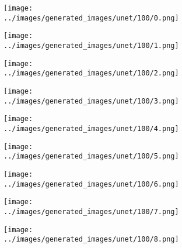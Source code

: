 \begin{figure}[H]
  \centering
 \captionsetup[subfigure]{labelformat=empty}
  \begin{subfigure}[b]{0.1\textwidth}
      \centering
      \texttt{[image: ../images/generated\_images/unet/100/0.png]}
  \end{subfigure}
  \hspace{1em}%
  \begin{subfigure}[b]{0.1\textwidth}
      \centering
      \texttt{[image: ../images/generated\_images/unet/100/1.png]}
  \end{subfigure}
  \hspace{1em}%
  \begin{subfigure}[b]{0.1\textwidth}
      \centering
      \texttt{[image: ../images/generated\_images/unet/100/2.png]}
  \end{subfigure}
  \hspace{1em}%
  \begin{subfigure}[b]{0.1\textwidth}
   \centering
   \texttt{[image: ../images/generated\_images/unet/100/3.png]}
 \end{subfigure}
 \hspace{1em}%
 \begin{subfigure}[b]{0.1\textwidth}
   \centering
   \texttt{[image: ../images/generated\_images/unet/100/4.png]}
 \end{subfigure}
 \hspace{1em}%
 \begin{subfigure}[b]{0.1\textwidth}
   \centering
   \texttt{[image: ../images/generated\_images/unet/100/5.png]}
 \end{subfigure}
 \hspace{1em}%
 \begin{subfigure}[b]{0.1\textwidth}
   \centering
   \texttt{[image: ../images/generated\_images/unet/100/6.png]}
 \end{subfigure}
 \hspace{1em}%
 \begin{subfigure}[b]{0.1\textwidth}
  \centering
  \texttt{[image: ../images/generated\_images/unet/100/7.png]}
\end{subfigure}
\hspace{1em}%
 \begin{subfigure}[b]{0.1\textwidth}
 \centering
 \texttt{[image: ../images/generated\_images/unet/100/8.png]}
 \end{subfigure}

\end{figure}
